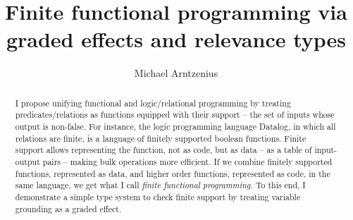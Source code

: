 \documentclass[sigplan,screen,dvipsnames,fleqn]{acmart}
\title{Finite functional programming via graded effects and relevance types}
\author{Michael Arntzenius}
\affiliation{%
  \institution{UC Berkeley}
  \city{Berkeley}
  \country{USA}
}
\newcommand{\todo}[1]{{\color{ACMRed}#1}}
\newcommand\<\;                 %
\begin{document}
\begin{abstract}
  I propose unifying functional and logic/relational programming by treating predicates/relations as functions equipped with their support -- the set of inputs whose output is non-false.
  For instance, the logic programming language Datalog, in which all relations are finite, is a language of finitely supported boolean functions.
  Finite support allows representing the function, not as code, but as data -- as a table of input-output pairs -- making bulk operations more efficient.
%
  If we combine finitely supported functions, represented as data, and higher order functions, represented as code, in the same language, we get what I call \emph{finite functional programming.}
  To this end, I demonstrate a simple type system to check finite support by treating variable grounding as a graded effect.
\end{abstract}

\maketitle







\end{document}
